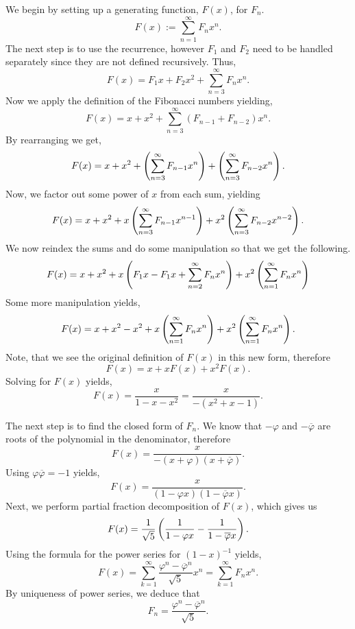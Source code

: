 \documentclass[notitlepage]{problem-solving}
\begin{document}
We begin by setting up a generating function, $F(x)$, for $F_n$.
\[
	F(x) := \sum_{n=1}^\infty F_n x^n.
\]
The next step is to use the recurrence, however $F_1$ and $F_2$ need to be handled separately since they are not defined recursively.
Thus,
\[
	F(x) = F_1 x + F_2 x^2 + \sum_{n=3}^\infty F_n x^n.
\]
Now we apply the definition of the Fibonacci numbers yielding,
\[
	F(x) = x + x^2 + \sum_{n=3}^\infty (F_{n-1} + F_{n-2}) x^n.
\]
By rearranging we get,
\[
	F(x) = x + x^2 +\left( \sum_{n=3}^\infty F_{n-1} x^n \right) + \left( \sum_{n=3}^\infty F_{n-2} x^n \right).
\]
Now, we factor out some power of $x$ from each sum, yielding
\[
	F(x) = x + x^2 +x\left( \sum_{n=3}^\infty F_{n-1} x^{n-1} \right) + x^2\left( \sum_{n=3}^\infty F_{n-2} x^{n-2} \right).
\]
We now reindex the sums and do some manipulation so that we get the following.
\[
	F(x) = x + x^2 +x\left( F_1x-F_1x+\sum_{n=2}^\infty F_{n} x^n \right) + x^2\left( \sum_{n=1}^\infty F_{n} x^n \right)
\]
Some more manipulation yields,
\[
	F(x) = x + x^2 -x^2 +x\left( \sum_{n=1}^\infty F_n x^n \right) + x^2 \left( \sum_{n=1}^\infty F_n x^n \right).
\]
Note, that we see the original definition of $F(x)$ in this new form, therefore
\[
	F(x) = x + xF(x) + x^2 F(x).
\]
Solving for $F(x)$ yields,
\[
	F(x) = \frac{x}{1-x-x^2} = \frac{x}{-(x^2+x-1)}.
\]

The next step is to find the closed form of $F_n$.
We know that $-\varphi$ and $-\overline{\varphi}$ are roots of  the polynomial in the denominator, therefore
\[
	F(x) = \frac{x}{-(x+\varphi)(x+\overline{\varphi})}.
\]
Using $\varphi\overline{\varphi} = -1$ yields,
\[
	F(x)=\frac{x}{(1-\varphi x)(1-\overline{\varphi}x)}.
\]
Next, we perform partial fraction decomposition of $F(x)$, which gives us
\[
	F(x) = \frac{1}{\sqrt{5}} \left( \frac{1}{1-\varphi x}-\frac{1}{1-\overline{\varphi}x} \right).
\]
Using the formula for the power series for $(1-x)^{-1}$ yields,
\[
	F(x) = \sum_{k=1}^\infty \frac{\varphi^n-\overline{\varphi}^n}{\sqrt{5}} x^n = \sum_{k=1}^\infty F_n x^n.
\]
By uniqueness of power series, we deduce that
\[
	F_n = \frac{\varphi^n-\overline{\varphi}^n}{\sqrt{5}}.
\]

\printbibliography
\end{document}
